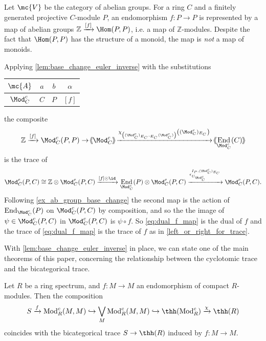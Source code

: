 \documentclass[11pt]{amsart}
\newcommand{\Z}{\mathbb{Z}}
\newcommand{\xto}{\xrightarrow}
\DeclareMathOperator{\End}{End}
\newcommand{\rbmm}[5]{{#1}^{{#2},{#5}}_{{#4}}} %
\def\shvar#1#2{{\ensuremath{%
  \hspace{1mm}\makebox[-1mm]{$#1\langle$}\makebox[0mm]{$#1\langle$}\hspace{1mm}%
  {#2}%
  \makebox[1mm]{$#1\rangle$}\makebox[0mm]{$#1\rangle$}%
}}}
\def\sh{\shvar{}}
\begin{document}
\begin{example}\label{ex:base_change_euler_monoid_rings}
  Let $\mc{V}$ be the category of abelian groups. For a ring $C$ and a finitely generated projective $C$-module $P$, 
an endomorphism $f\colon P \to P$ is represented by a map of abelian groups $\Z \xto{[f]} \Hom(P, P)$, i.e. a map of $\Z$-modules. Despite the fact that $\Hom(P, P)$ has the structure of a monoid, the map is \textit{not} a map of monoids. 

Applying \cref{lem:base_change_euler_inverse} with the substitutions
\begin{center}
\begin{tabular}{c|c|c|c}
$\mc{A}$
&$a$
&$b$
&$\alpha$
\\
\hline
$\Mod_C^c$
&$C$
&$P$
&$[f]$
\end{tabular}
\end{center}
the composite 
\[\Z\xto{[f]}\Mod_C^c(P,P)
\to  \sh{\Mod_C^c}\xto{\chi_{\left((\Mod_C^c)_{E_C},{_{E_C}(\Mod_C^c)}\right)} \left((\Mod_C^c)_{E_C}\right)} \sh{\End_{\Mod_C^c}(C)}\]
is
the trace of 
\begin{equation}\label{eq:dual_f_map}
\Mod_C^c(P,C) \cong \Z\otimes  \Mod_C^c(P,C)  \xto{[f] \odot \id} \End_{\Mod_C^c}(P) \otimes \Mod_C^c(P,C)   \xto{\rbmm{\epsilon}{I_P}{\Mod_C^c}{U_{\Mod_C^c}}{(\Mod_C^c)_{E_C}}}  \Mod_C^c(P,C) .
\end{equation}
Following \cref{ex_ab_group_base_change} the second map is the action of $\End_{\Mod_C^c}(P) $ on $\Mod_C^c(P,C) $ by composition, and so the 
the image of $\psi\in \Mod_C^c(P,C) $ in $\Mod_C^c(P,C) $  is $\psi\circ f$. So \eqref{eq:dual_f_map}
 is the dual of $f$ and the trace of  \eqref{eq:dual_f_map} is the trace of $f$ as in \cref{left_or_right_for_trace}.
\end{example}

With \cref{lem:base_change_euler_inverse} in place, we can state one of the main theorems of this paper, concerning the relationship between the cyclotomic trace and the bicategorical trace. 

\begin{thm}\label{thm:pi_0_THH}
  Let $R$ be a ring spectrum, and $f\colon M \to M$ an endomorphism of compact $R$-modules. Then the composition
  \[
  S \xrightarrow{f} \operatorname{Mod}^c_R (M, M) \hookrightarrow \bigvee_M \operatorname{Mod}^c_R(M, M) \hookrightarrow \thh (\operatorname{Mod}^c_R) \xrightarrow{\chi} \thh(R)
  \]
  coincides with the bicategorical trace $S \to \thh(R)$ induced by $f\colon M \to M$. 
\end{thm}
\end{document}
